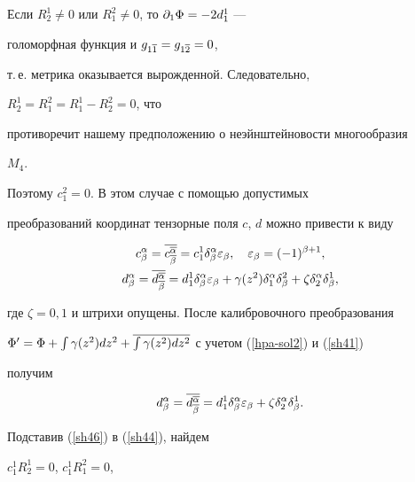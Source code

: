 Если $R^1_2 \ne 0$ или $R^2_1 \ne 0$, то $\partial_{1} \Phi = -2d^1_1$ ---


голоморфная функция и $g_{1\overline 1}=g_{1\overline 2}=0$,


т.\,е. метрика оказывается вырожденной. Следовательно,


$R^1_2 = R^2_1 = R^1_1 - R^2_2 = 0$, что


противоречит нашему предположению о неэйнштейновости многообразия


$M_4$.


Поэтому $c^2_1=0$. В этом случае с помощью допустимых


преобразований координат тензорные поля $c$, $d$ можно привести к виду


\begin{gather}


\label{sh46}


c^\alpha_\beta = \ol{c^{\ol\alpha}_{\ol\beta}} = c^1_1


\delta_\beta^\alpha \ve\beta, \quad \ve\beta =(-1)^{\beta+1},\\


d^\alpha_\beta = \ol{d^{\ol\alpha}_{\ol\beta}} = d^1_1


\delta_\beta^\alpha \ve\beta +


\gamma (z^2) \delta^\alpha_1 \delta^2_\beta


+ \zeta \delta^\alpha_2 \delta^1_\beta,\notag


\end{gather}


где $\zeta =0,1$ и штрихи опущены. После калибровочного преобразования


$\Phi' = \Phi +\int \gamma(z^2) dz^2 +


\ol{\int \gamma(z^2) d z^2}$ с учетом (\ref{hpa-sol2}) и (\ref{sh41})


получим


\begin{equation}


\label{sh47}


d^\alpha_\beta = \ol{d^{\ol\alpha}_{\ol\beta}} = d^1_1


\delta_\beta^\alpha\ve\beta+\zeta\delta^\alpha_2 \delta^1_\beta.


\end{equation}





Подставив (\ref{sh46}) в (\ref{sh44}), найдем


$c^1_1 R^1_2 =0$, $c^1_1 R^2_1 =0$,


